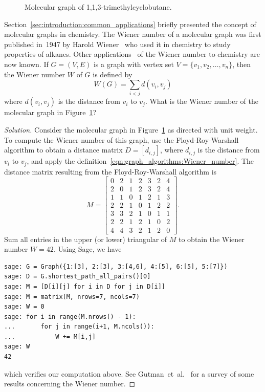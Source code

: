 \begin{figure}[!htbp]
\centering

\caption{Molecular graph of 1,1,3-trimethylcyclobutane.}
\label{fig:graph_algorithms:trimethylcyclobutane}
\end{figure}

\begin{example}
Section~\ref{sec:introduction:common_applications} briefly presented
the concept of molecular graphs in chemistry. The Wiener number of a
molecular graph was first published in~1947 by Harold
Wiener~\cite{Wiener1947} who used it in chemistry to study properties
of alkanes. Other applications~\cite{GutmanEtAl1993} of the Wiener
number to chemistry are now known. If $G = (V,E)$ is a graph with
vertex set $V = \{v_1, v_2, \dots, v_n\}$, then the Wiener number $W$
of $G$ is defined by
\begin{equation}
\label{eqn:graph_algorithms:Wiener_number}
W(G)
=
\sum_{i < j} d(v_i, v_j)
\end{equation}
where $d(v_i, v_j)$ is the distance from $v_i$ to $v_j$. What is the
Wiener number of the molecular graph in
Figure~\ref{fig:graph_algorithms:trimethylcyclobutane}?
\end{example}

\begin{proof}[Solution]
Consider the molecular graph in
Figure~\ref{fig:graph_algorithms:trimethylcyclobutane} as directed
with unit weight. To compute the Wiener number of this graph, use the
Floyd-Roy-Warshall algorithm to obtain a distance matrix
$D = [d_{i,j}]$, where $d_{i,j}$ is the distance from $v_i$ to $v_j$,
and apply the
definition~\eqref{eqn:graph_algorithms:Wiener_number}. The distance
matrix resulting from the Floyd-Roy-Warshall algorithm is
\[
M
=
\begin{bmatrix}
0 & 2 & 1 & 2 & 3 & 2 & 4 \\
2 & 0 & 1 & 2 & 3 & 2 & 4 \\
1 & 1 & 0 & 1 & 2 & 1 & 3 \\
2 & 2 & 1 & 0 & 1 & 2 & 2 \\
3 & 3 & 2 & 1 & 0 & 1 & 1 \\
2 & 2 & 1 & 2 & 1 & 0 & 2 \\
4 & 4 & 3 & 2 & 1 & 2 & 0
\end{bmatrix}.
\]
Sum all entries in the upper (or lower) triangular of $M$ to obtain
the Wiener number $W = 42$. Using Sage, we have
\begin{lstlisting}
sage: G = Graph({1:[3], 2:[3], 3:[4,6], 4:[5], 6:[5], 5:[7]})
sage: D = G.shortest_path_all_pairs()[0]
sage: M = [D[i][j] for i in D for j in D[i]]
sage: M = matrix(M, nrows=7, ncols=7)
sage: W = 0
sage: for i in range(M.nrows() - 1):
...       for j in range(i+1, M.ncols()):
...           W += M[i,j]
sage: W
42
\end{lstlisting}
which verifies our computation above. See
Gutman~et~al.~\cite{GutmanEtAl1993} for a survey of some results
concerning the Wiener number.
\end{proof}



